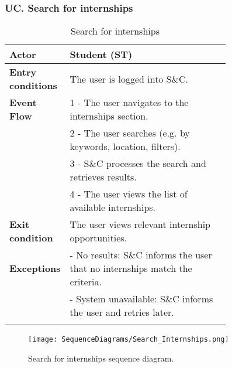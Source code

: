 \subsubsection*{UC\cuc . Search for internships}
\begin{center}
    \begin{longtable}{|l|p{0.75\linewidth}|}
        \hline
        \textbf{Actor}            & Student (ST) \\
        \hline
        \textbf{Entry conditions} & The user is logged into S\&C. \\
        \hline
        \textbf{Event Flow}       & 1 - The user navigates to the internships section. \\
        & 2 - The user searches (e.g. by keywords, location, filters). \\
        & 3 - S\&C processes the search and retrieves results. \\
        & 4 - The user views the list of available internships. \\
        \hline
        \textbf{Exit condition}   & The user views relevant internship opportunities. \\       
        \hline
        \textbf{Exceptions}       & - No results: S\&C informs the user that no internships match the criteria. \\
                                  & - System unavailable: S\&C informs the user and retries later. \\
        \hline
        \caption{Search for internships}
        \label{tab:search_internships_usecase}
    \end{longtable}
\end{center}

\begin{figure}[H]
    \begin{center}
        \texttt{[image: SequenceDiagrams/Search\_Internships.png]}
        \caption{Search for internships sequence diagram.}
        \label{fig:search_internships_seqd}%
    \end{center}
\end{figure}

